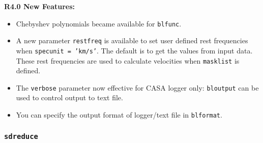 \medskip
{\bf R4.0 New Features:}\\
\begin{itemize}
\item Chebyshev polynomials became available for {\tt blfunc}. 
\item A new parameter {\tt restfreq} is available to set user defined
  rest frequencies when {\tt specunit = 'km/s'}. The default is to get
  the values from input data.
  These rest frequencies are used to calculate velocities when 
  {\tt masklist} is defined.
\item The {\tt verbose} parameter now effective for CASA logger only: 
{\tt bloutput} can be used to control output to text file. 
\item You can specify the output format of logger/text file in {\tt blformat}. 
\end{itemize}


\subsubsection{{\tt sdreduce}}
\label{section:sd.sdtasks.tasks.sdreduce}

